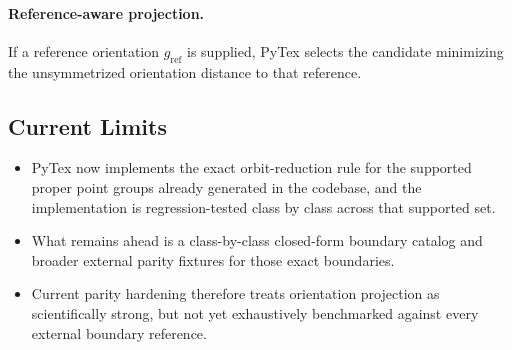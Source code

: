 \paragraph{Reference-aware projection.}
If a reference orientation \(g_{\mathrm{ref}}\) is supplied, PyTex selects the candidate minimizing the unsymmetrized orientation distance to that reference.

\subsection{Current Limits}

\begin{itemize}
  \item PyTex now implements the exact orbit-reduction rule for the supported proper point groups already generated in the codebase, and the implementation is regression-tested class by class across that supported set.
  \item What remains ahead is a class-by-class closed-form boundary catalog and broader external parity fixtures for those exact boundaries.
  \item Current parity hardening therefore treats orientation projection as scientifically strong, but not yet exhaustively benchmarked against every external boundary reference.
\end{itemize}
